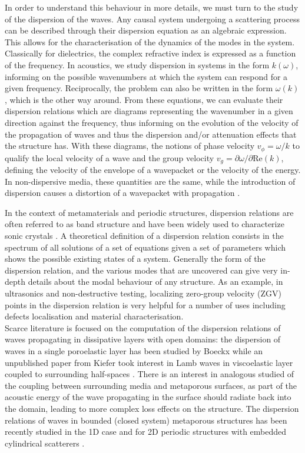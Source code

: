 In order to understand this behaviour in more details, we must turn to the study of the dispersion of the waves. Any causal system undergoing a scattering process can be described through their dispersion equation \cite{toll1956} as an algebraic expression. This allows for the characterisation of the dynamics of the modes in the system. Classically for dielectrics, the complex refractive index is expressed as a function of the frequency\cite{collin1991}. In acoustics, we study dispersion in systems in the form $k(\omega)$, informing on the possible wavenumbers at which the system can respond for a given frequency. Reciprocally, the problem can also be written in the form $\omega(k)$, which is the other way around. From these equations, we can evaluate their dispersion relations which are diagrams representing the wavenumber in a given direction against the frequency\cite{brillouin1946}, thus informing on the evolution of the velocity of the propagation of waves and thus the dispersion and/or attenuation effects that the structure has. With these diagrams, the notions of phase velocity $v_\phi = \omega/k$ to qualify the local velocity of a wave and the group velocity $v_g = \partial \omega / \partial \mathrm{Re}(k)$, defining the velocity of the envelope of a wavepacket or the velocity of the energy. In non-dispersive media, these quantities are the same, while the introduction of dispersion causes a distortion of a wavepacket with propagation \cite{brillouin1960}. 

In the context of metamaterials and periodic structures, dispersion relations are often referred to as band structure and have been widely used to characterize  \cite{lambhorace1917} sonic crystals \cite{romero-garcia2010, }. A theoretical definition of a dispersion relation consists in the spectrum of all solutions of a set of equations given a set of parameters which shows the possible existing states of a system. Generally the form of the dispersion relation, and the various modes that are uncovered can give very in-depth details about the modal behaviour of any structure. As an example, in ultrasonics and non-destructive testing, localizing zero-group velocity (ZGV) points in the dispersion relation is very helpful for a number of uses including defects localisation and material characterisation\cite{prada2008}.\\

Scarce literature is focused on the computation of the dispersion relations of waves propagating in dissipative layers with open domains: the dispersion of waves in a single poroelastic layer has been studied by Boeckx \etal \cite{boeckx2005a,boeckx2005} while an unpublished paper from Kiefer \etal took interest in Lamb waves in viscoelastic layer coupled to surrounding half-spaces \cite{kiefer2020}. There is an interest in analogous studied of the coupling between surrounding media and metaporous surfaces, as part of the acoustic energy of the wave propagating in the surface should radiate back into the domain, leading to more complex loss effects on the structure. The dispersion relations of waves in bounded (closed system) metaporous structures has been recently studied in the 1D case \cite{wang2019} and for 2D periodic structures with embedded cylindrical scatterers \cite{wang2020,zhang2023}. 


